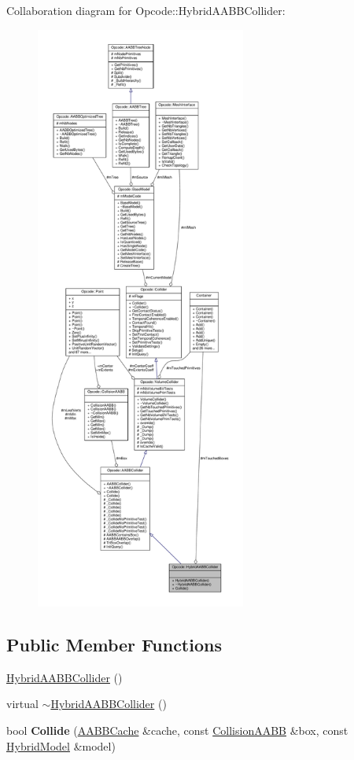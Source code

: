 Collaboration diagram for Opcode\+:\+:Hybrid\+A\+A\+B\+B\+Collider\+:
\nopagebreak
\begin{figure}[H]
\begin{center}
\leavevmode
\includegraphics[height=550pt]{d4/d6a/classOpcode_1_1HybridAABBCollider__coll__graph}
\end{center}
\end{figure}
\subsection*{Public Member Functions}
\begin{DoxyCompactItemize}
\item 
\hyperlink{classOpcode_1_1HybridAABBCollider_a22e09dd587b3b0f63f9bce1a9b84bbed}{Hybrid\+A\+A\+B\+B\+Collider} ()
\item 
virtual \hyperlink{classOpcode_1_1HybridAABBCollider_adc5ed4de439a7177b255d22e0da87347}{$\sim$\+Hybrid\+A\+A\+B\+B\+Collider} ()
\item 
bool {\bfseries Collide} (\hyperlink{structOpcode_1_1AABBCache}{A\+A\+B\+B\+Cache} \&cache, const \hyperlink{classOpcode_1_1CollisionAABB}{Collision\+A\+A\+BB} \&box, const \hyperlink{classOpcode_1_1HybridModel}{Hybrid\+Model} \&model)\hypertarget{classOpcode_1_1HybridAABBCollider_a166977ef6944a03cb4c1b3633e54216a}{}\label{classOpcode_1_1HybridAABBCollider_a166977ef6944a03cb4c1b3633e54216a}

\end{DoxyCompactItemize}
